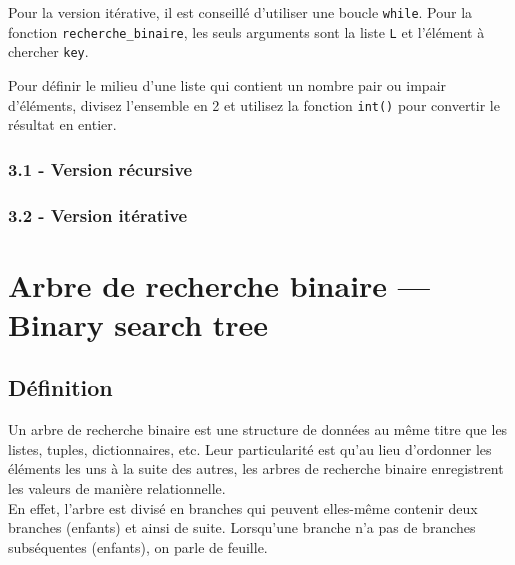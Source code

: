 \begin{Exercice}[20 minutes]
\begin{conseil}
            Pour la version itérative, il est conseillé d'utiliser une boucle \lstinline{while}. Pour la fonction \lstinline{recherche_binaire}, les seuls arguments sont la liste \texttt{L} et l'élément à chercher \lstinline{key}. 
        \end{conseil}

        \begin{conseil}
            Pour définir le milieu d'une liste qui contient un nombre pair ou impair d'éléments, divisez l'ensemble en 2 et utilisez la fonction \lstinline{int()} pour convertir le résultat en entier. 
            
        \end{conseil}
    
        \begin{solution}
            \subsubsection*{3.1 - Version récursive}
            
        \end{solution}
        \begin{solution}
            \subsubsection*{3.2 - Version itérative}
            
        \end{solution}
    
    \end{Exercice}
    
    \section{Arbre de recherche binaire — Binary search tree}   
    \subsection{Définition}
    
    Un arbre de recherche binaire est une structure de données au même titre que les listes, tuples, dictionnaires, etc. Leur particularité est qu'au lieu d'ordonner les éléments les uns à la suite des autres, les arbres de recherche binaire enregistrent les valeurs de manière relationnelle.\\
    
    En effet, l'arbre est divisé en branches qui peuvent elles-même contenir deux branches (enfants) et ainsi de suite. Lorsqu'une branche n'a pas de branches subséquentes (enfants), on parle de feuille.\\
    
